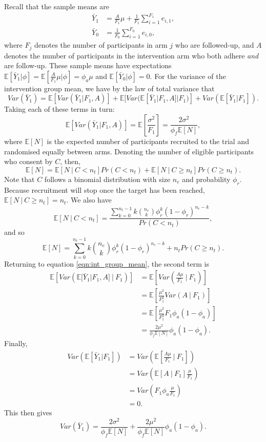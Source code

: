 \documentclass[AMA,STIX1COL]{WileyNJD-v2}
\begin{document}
Recall that the sample means are
\begin{align*}
\bar{Y}_1 &= \frac{A}{F_1}\mu + \frac{1}{F_1} \sum_{i=1}^{F_1} e_{i,1}, \\
\bar{Y}_0 &= \frac{1}{F_0}\sum_{i=1}^{F_0} e_{i,0},
\end{align*}
where $F_j$ denotes the number of participants in arm $j$ who are followed-up, and $A$ denotes the number of participants in the intervention arm who both adhere \emph{and} are follow-up. These sample means have expectations $\mathbb{E}[\bar{Y}_1 | \phi] = \mathbb{E}[\frac{A}{F_1}\mu | \phi] = \phi_a \mu$ and $\mathbb{E}[\bar{Y}_0 | \phi] = 0$. For the variance of the intervention group mean, we have by the law of total variance that
\begin{equation}\label{eqn:int_group_mean}
Var(\bar{Y}_1) = \mathbb{E}[Var(\bar{Y}_1 | F_1, A)] + 
\mathbb{E}[Var(\mathbb{E}[\bar{Y}_1 | F_1, A] | F_1)] + 
Var(\mathbb{E}[\bar{Y}_1 | F_1]).
\end{equation}
Taking each of these terms in turn:
$$
\mathbb{E}[Var(\bar{Y}_1 | F_1, A)] = \mathbb{E} \left[ \frac{\sigma^2}{F_1} \right] = \frac{2\sigma^2}{\phi_f \mathbb{E}[N]},
$$
where $\mathbb{E}[N]$ is the expected number of participants recruited to the trial and randomised equally between arms. Denoting the number of eligible participants who consent by $C$, then,
$$
\mathbb{E}[N] = \mathbb{E}[N ~|~ C < n_t] Pr(C < n_t) + \mathbb{E}[N ~|~ C \geq n_t] Pr(C \geq n_t).
$$
Note that $C$ follows a binomial distribution with size $n_e$ and probability $\phi_r$. Because recruitment will stop once the target has been reached, $\mathbb{E}[N ~|~ C \geq n_t] = n_t$. We also have
$$
\mathbb{E}[N ~|~ C < n_t] = \frac{\sum_{k=0}^{n_t-1} k{n_e \choose k} \phi_r^k (1-\phi_r)^{n_e - k} } {Pr(C < n_t)},
$$
and so 
$$
\mathbb{E}[N] = \sum_{k=0}^{n_t-1} k{n_e \choose k} \phi_r^k (1-\phi_r)^{n_e - k} + n_t Pr(C \geq n_t).
$$
Returning to equation \ref{eqn:int_group_mean}, the second term is 
\begin{align*}
\mathbb{E} \left[ Var(\mathbb{E}[\bar{Y}_1 | F_1, A] ~|~ F_1) \right] &= \mathbb{E} \left[ Var \left(\frac{A\mu}{F_1} ~|~ F_1 \right) \right] \\
&= \mathbb{E} \left[\frac{\mu^2}{F_1^2} Var(A ~|~ F_1) \right] \\
&= \mathbb{E} \left[ \frac{\mu^2}{F_1^2} F_1 \phi_a (1-\phi_a) \right] \\
&= \frac{2\mu^2}{\phi_f \mathbb{E}[N]} \phi_a (1-\phi_a).
\end{align*}
Finally,
\begin{align*}
Var(\mathbb{E}[\bar{Y}_1 | F_1]) &= Var \left( \mathbb{E} \left[ \frac{A \mu}{F_1} ~|~ F_1 \right] \right) \\
&= Var \left( \mathbb{E} \left[ A ~|~ F_1 \right] \frac{\mu}{F_1} \right) \\
&= Var \left( F_1 \phi_a \frac{\mu}{F_1} \right) \\
&= 0.
\end{align*}
This then gives
$$
Var(\bar{Y}_1) = \frac{2\sigma^2}{\phi_f \mathbb{E}[N]} + \frac{2\mu^2}{\phi_f \mathbb{E}[N]} \phi_a (1-\phi_a).
$$
\end{document}
